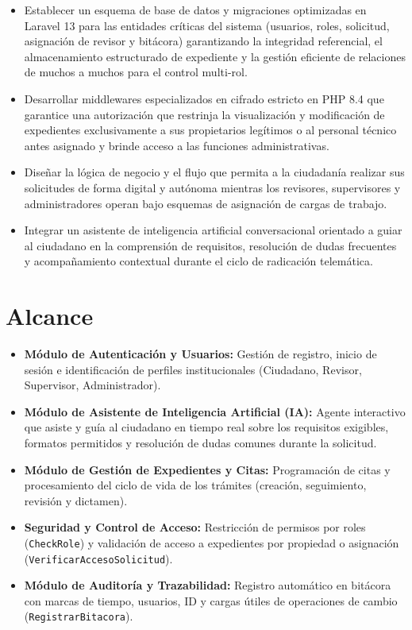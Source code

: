 \begin{itemize}
    \item Establecer un esquema de base de datos y migraciones optimizadas en Laravel 13 para las entidades críticas del sistema (usuarios, roles, solicitud, asignación de revisor y bitácora) garantizando la integridad referencial, el almacenamiento estructurado de expediente y la gestión eficiente de relaciones de muchos a muchos para el control multi-rol.
    \item Desarrollar middlewares especializados en cifrado estricto en PHP 8.4 que garantice una autorización que restrinja la visualización y modificación de expedientes exclusivamente a sus propietarios legítimos o al personal técnico antes asignado y brinde acceso a las funciones administrativas.
    \item Diseñar la lógica de negocio y el flujo que permita a la ciudadanía realizar sus solicitudes de forma digital y autónoma mientras los revisores, supervisores y administradores operan bajo esquemas de asignación de cargas de trabajo.
    \item Integrar un asistente de inteligencia artificial conversacional orientado a guiar al ciudadano en la comprensión de requisitos, resolución de dudas frecuentes y acompañamiento contextual durante el ciclo de radicación telemática.
\end{itemize}

\section{Alcance}

\begin{itemize}
    \item \textbf{Módulo de Autenticación y Usuarios:} Gestión de registro, inicio de sesión e identificación de perfiles institucionales (Ciudadano, Revisor, Supervisor, Administrador).
    \item \textbf{Módulo de Asistente de Inteligencia Artificial (IA):} Agente interactivo que asiste y guía al ciudadano en tiempo real sobre los requisitos exigibles, formatos permitidos y resolución de dudas comunes durante la solicitud.
    \item \textbf{Módulo de Gestión de Expedientes y Citas:} Programación de citas y procesamiento del ciclo de vida de los trámites (creación, seguimiento, revisión y dictamen).
    \item \textbf{Seguridad y Control de Acceso:} Restricción de permisos por roles (\texttt{CheckRole}) y validación de acceso a expedientes por propiedad o asignación (\texttt{VerificarAccesoSolicitud}).
    \item \textbf{Módulo de Auditoría y Trazabilidad:} Registro automático en bitácora con marcas de tiempo, usuarios, ID y cargas útiles de operaciones de cambio (\texttt{RegistrarBitacora}).
\end{itemize}

